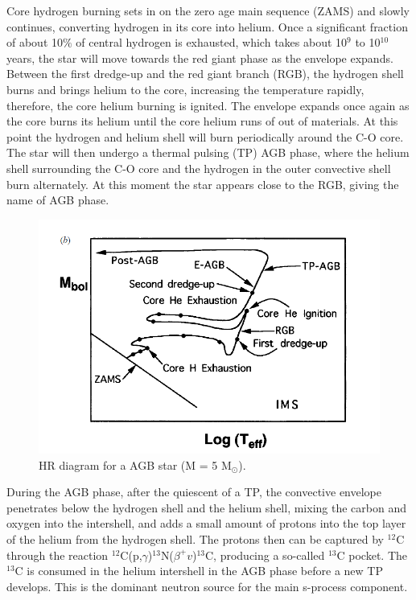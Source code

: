 Core hydrogen burning sets in on the zero age main sequence (ZAMS) and   slowly continues,  converting hydrogen in its core into helium. Once a significant fraction of about 10$\%$ of central hydrogen is exhausted, which takes about 10$^9$ to 10$^{10}$ years, the star will move towards the red giant phase as the envelope expands. Between the first dredge-up and the red giant branch (RGB), the hydrogen shell burns  and brings helium to the core, increasing the temperature rapidly, therefore, the core helium burning is ignited. The envelope expands once again as the core burns its helium until the core helium runs of out of materials. At this point the hydrogen and helium shell will burn periodically around the C-O core. The star will then undergo a thermal pulsing (TP) AGB phase, where the helium shell surrounding the C-O core and the hydrogen in the outer convective shell  burn alternately. At this moment the star appears close to the RGB, giving the name of AGB phase.


\begin{figure}[tpb]
  \begin{center}
    \centerline{\includegraphics[scale=0.6]{graph/ch1/AGB_HR}}
    \caption{HR diagram for a AGB star (M = 5 M$_\odot$).}
    \label{fig:AGB}
  \end{center}
\end{figure}

During the AGB phase, after the quiescent of a TP, the convective envelope penetrates below the hydrogen shell and the helium shell, mixing the carbon and oxygen into the intershell, and adds a small amount of protons into the top layer of the helium from the hydrogen shell. The protons then can be captured by $^{12}$C through the reaction $^{12}$C(p,$\gamma$)$^{13}$N($\beta^+v$)$^{13}$C, producing a so-called $^{13}$C pocket. The $^{13}$C is consumed in the helium intershell in the AGB phase before a new TP develops. This is the dominant neutron source for the main s-process component.

